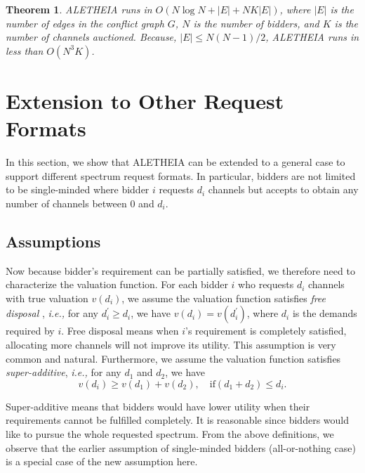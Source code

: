 \documentclass{sig-alternate}
\newtheorem{theorem}{Theorem}
\begin{document}
\begin{theorem}
ALETHEIA runs in $O(N\log N + |E| + NK|E|)$, where $|E|$ is the number of edges in the conflict graph $G$, $N$ is the number of bidders, and $K$ is the number of channels auctioned. Because, $|E| \le N(N-1)/2$, ALETHEIA runs in less than $O(N^3K)$.
\end{theorem}



\section{Extension to Other Request Formats}

In this section, we show that ALETHEIA can be extended to a general case to support different spectrum request formats. In particular, bidders are not limited to be single-minded where bidder $i$ requests $d_i$ channels but accepts to obtain any number of channels between 0 and $d_i$.

\subsection{Assumptions}
Now because bidder's requirement can be partially satisfied, we therefore need to characterize the valuation function. For each bidder $i$ who requests $d_i$ channels with true valuation $v(d_i)$, we assume the valuation function satisfies  \emph{free disposal} \cite{Bartal:ACM:03}, \emph{i.e.,} for any $d_i^{'}\ge d_i$, we have $v(d_i) = v(d_i^{'})$, where $d_i$ is the demands required by $i$. Free disposal means when $i$'s requirement is completely satisfied, allocating more channels will not improve its utility. This assumption is very common and natural.
Furthermore, we assume the valuation function satisfies \emph{super-additive}, \emph{i.e.,} for any  $d_1$ and $d_2$,  we have
\begin{equation}
\label{eq_e}
v(d_i) \ge v(d_1)+v(d_2), \quad \text{if}  (d_1+d_2) \le d_i.
\end{equation}

Super-additive means that bidders would have lower utility when their requirements cannot be fulfilled completely. It is reasonable since bidders would like to pursue the whole requested spectrum. From the above definitions, we observe that the earlier assumption of single-minded bidders (all-or-nothing case) is a special case of the new assumption here.
\end{document}
